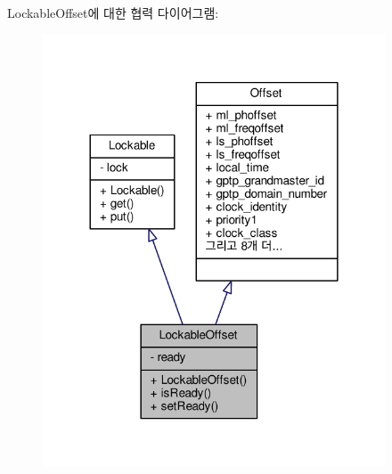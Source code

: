 Lockable\+Offset에 대한 협력 다이어그램\+:
\nopagebreak
\begin{figure}[H]
\begin{center}
\leavevmode
\includegraphics[width=288pt]{class_lockable_offset__coll__graph}
\end{center}
\end{figure}
